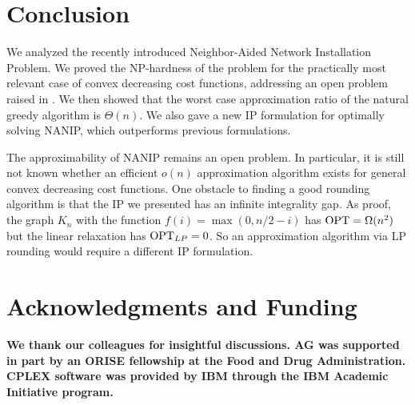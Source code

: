 \documentclass[english]{llncs}
\newcommand{\chg}[1]{\textbf{\color{red} #1}}
\begin{document}
\section{Conclusion} \label{sec:concl}
We analyzed the recently introduced Neighbor-Aided Network Installation
Problem.  We proved the NP-hardness of the problem for the practically most
relevant case of convex decreasing cost functions, addressing an open problem
raised in \cite{Gutfraind14}.  We then showed that the worst case approximation
ratio of the natural greedy algorithm is $\Theta(n)$.  We also gave a new IP
formulation for optimally solving NANIP, which outperforms previous
formulations.

The approximability of NANIP remains an open problem. In particular, it is
still not known whether an efficient $o(n)$ approximation algorithm exists for
general convex decreasing cost functions. One obstacle to finding a good
rounding algorithm is that the IP we presented has an infinite integrality gap.
As proof, the graph $K_n$ with the function $f(i) = \max(0, n/2 - i)$ has
$\textup{OPT} = \Omega(n^2)$ but the linear relaxation has $\textup{OPT}_{LP} =
0$. So an approximation algorithm via LP rounding would require a different IP
formulation.

\section*{Acknowledgments and Funding}
\chg{We thank our colleagues for insightful discussions.
AG was supported in part by an ORISE fellowship at the Food and Drug Administration.
CPLEX software was provided by IBM through the IBM Academic Initiative program.}



\end{document}
